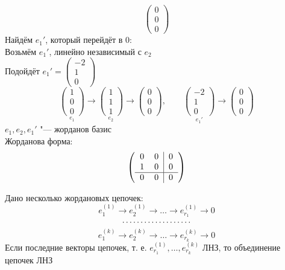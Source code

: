 \begin{eg}
\begin{itemize}
$$	\begin{pmatrix}
		0 \\
		0 \\
		0
	\end{pmatrix} $$
	Найдём $ e_1' $, который перейдёт в 0: \\
	Возьмём $ e_1' $, линейно независимый с $ e_2 $ \\
	Подойдёт $ e_1' =
	\begin{pmatrix}
		-2 \\
		1 \\
		0
	\end{pmatrix} $
	$$ \underset{e_1}{
		\begin{pmatrix}
			1 \\
			0 \\
			0
		\end{pmatrix}} \to \underset{e_2}{
		\begin{pmatrix}
			1 \\
			1 \\
			1
		\end{pmatrix}} \to
	\begin{pmatrix}
		0 \\
		0 \\
		0
	\end{pmatrix}, \qquad \underset{e_1'}{
		\begin{pmatrix}
			-2 \\
			1 \\
			0
		\end{pmatrix}} \to
	\begin{pmatrix}
		0 \\
		0 \\
		0
	\end{pmatrix} $$
	$ e_1, e_2, e_1' $ "--- жорданов базис \\
	Жорданова форма:
	$$ \left(
	\begin{tabular}{c c | c}
		0 & 0 & 0 \\
		1 & 0 & 0 \\
		\hline
		0 & 0 & 0
	\end{tabular} \right) $$
	\end{itemize}
\end{eg}

\begin{lemma}
	Дано несколько жордановых цепочек:
	$$ e_1^{(1)} \to e_2^{(1)} \to \dots \to e_{r_1}^{(1)} \to 0 $$
	$$ \widedots $$
	$$ e_1^{(k)} \to e_2^{(k)} \to \dots \to e_{r_k}^{(k)} \to 0 $$
	Если последние векторы цепочек, т. е. $ e_{r_1}^{(1)}, \dots, e_{r_k}^{(k)} $ ЛНЗ, то объединение цепочек ЛНЗ
\end{lemma}

